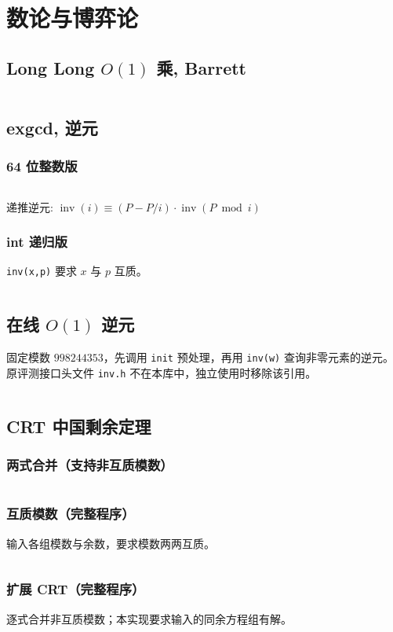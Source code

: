 \section{数论与博弈论}
					\subsection{Long Long \texorpdfstring{$O(1)$}{O(1)} 乘, Barrett}
					\inputminted{cpp}{sections/NumberTheory/assets/Miscellany/LLFPM.cpp}
				\subsection{exgcd, 逆元}
					\subsubsection{64 位整数版}
					\inputminted{cpp}{sections/NumberTheory/assets/Math/exgcd.cpp}
					递推逆元: $\operatorname{inv}(i) \equiv (P - P / i) \cdot \operatorname{inv}(P \bmod i)$
					\subsubsection{int 递归版}
					\texttt{inv(x,p)} 要求 $x$ 与 $p$ 互质。
					\inputminted{cpp}{sections/NumberTheory/assets/Math/exgcd-int.cpp}
				\subsection{在线 \texorpdfstring{$O(1)$}{O(1)} 逆元}
					固定模数 $998244353$，先调用 \texttt{init} 预处理，再用 \texttt{inv(w)} 查询非零元素的逆元。
					原评测接口头文件 \texttt{inv.h} 不在本库中，独立使用时移除该引用。
					\inputminted{cpp}{sections/NumberTheory/assets/Math/在线O(1)逆元.cpp}
				\subsection{CRT 中国剩余定理}
					\subsubsection{两式合并（支持非互质模数）}
					\inputminted{cpp}{sections/NumberTheory/assets/Math/CRT_lbn.cpp}
					\subsubsection{互质模数（完整程序）}
					输入各组模数与余数，要求模数两两互质。
					\inputminted{cpp}{sections/NumberTheory/assets/Math/CRT.cpp}
					\subsubsection{扩展 CRT（完整程序）}
					逐式合并非互质模数；本实现要求输入的同余方程组有解。
					\inputminted{cpp}{sections/NumberTheory/assets/Math/EXCRT.cpp}
